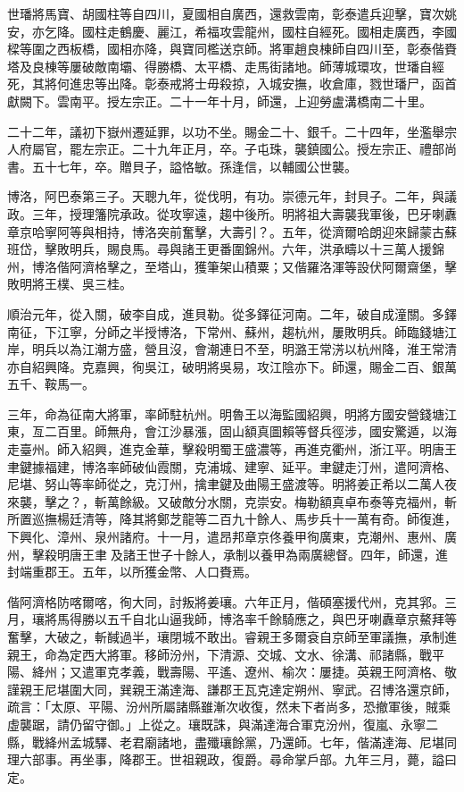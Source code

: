 \begin{pinyinscope}
世璠將馬寶、胡國柱等自四川，夏國相自廣西，還救雲南，彰泰遣兵迎擊，寶次姚安，亦乞降。國柱走鶴慶、麗江，希福攻雲龍州，國柱自經死。國相走廣西，李國樑等圍之西板橋，國相亦降，與寶同檻送京師。將軍趙良棟師自四川至，彰泰偕賚塔及良棟等屢破敵南壩、得勝橋、太平橋、走馬街諸地。師薄城環攻，世璠自經死，其將何進忠等出降。彰泰戒將士毋殺掠，入城安撫，收倉庫，戮世璠尸，函首獻闕下。雲南平。授左宗正。二十一年十月，師還，上迎勞盧溝橋南二十里。

二十二年，議初下嶽州遷延罪，以功不坐。賜金二十、銀千。二十四年，坐濫舉宗人府屬官，罷左宗正。二十九年正月，卒。子屯珠，襲鎮國公。授左宗正、禮部尚書。五十七年，卒。贈貝子，謚恪敏。孫逢信，以輔國公世襲。

博洛，阿巴泰第三子。天聰九年，從伐明，有功。崇德元年，封貝子。二年，與議政。三年，授理籓院承政。從攻寧遠，趨中後所。明將祖大壽襲我軍後，巴牙喇纛章京哈寧阿等與相持，博洛突前奮擊，大壽引？。五年，從濟爾哈朗迎來歸蒙古蘇班岱，擊敗明兵，賜良馬。尋與諸王更番圍錦州。六年，洪承疇以十三萬人援錦州，博洛偕阿濟格擊之，至塔山，獲筆架山積粟；又偕羅洛渾等設伏阿爾齋堡，擊敗明將王樸、吳三桂。

順治元年，從入關，破李自成，進貝勒。從多鐸征河南。二年，破自成潼關。多鐸南征，下江寧，分師之半授博洛，下常州、蘇州，趨杭州，屢敗明兵。師臨錢塘江岸，明兵以為江潮方盛，營且沒，會潮連日不至，明潞王常淓以杭州降，淮王常清亦自紹興降。克嘉興，徇吳江，破明將吳易，攻江陰亦下。師還，賜金二百、銀萬五千、鞍馬一。

三年，命為征南大將軍，率師駐杭州。明魯王以海監國紹興，明將方國安營錢塘江東，亙二百里。師無舟，會江沙暴漲，固山額真圖賴等督兵徑涉，國安驚遁，以海走臺州。師入紹興，進克金華，擊殺明蜀王盛濃等，再進克衢州，浙江平。明唐王聿鍵據福建，博洛率師破仙霞關，克浦城、建寧、延平。聿鍵走汀州，遣阿濟格、尼堪、努山等率師從之，克汀州，擒聿鍵及曲陽王盛渡等。明將姜正希以二萬人夜來襲，擊之？，斬萬餘級。又破敵分水關，克崇安。梅勒額真卓布泰等克福州，斬所置巡撫楊廷清等，降其將鄭芝龍等二百九十餘人、馬步兵十一萬有奇。師復進，下興化、漳州、泉州諸府。十一月，遣昂邦章京佟養甲徇廣東，克潮州、惠州、廣州，擊殺明唐王聿及諸王世子十餘人，承制以養甲為兩廣總督。四年，師還，進封端重郡王。五年，以所獲金幣、人口賚焉。

偕阿濟格防喀爾喀，徇大同，討叛將姜瓖。六年正月，偕碩塞援代州，克其郛。三月，瓖將馬得勝以五千自北山逼我師，博洛率千餘騎應之，與巴牙喇纛章京鰲拜等奮擊，大破之，斬馘過半，瓖閉城不敢出。睿親王多爾袞自京師至軍議撫，承制進親王，命為定西大將軍。移師汾州，下清源、交城、文水、徐溝、祁諸縣，戰平陽、絳州；又遣軍克孝義，戰壽陽、平遙、遼州、榆次：屢捷。英親王阿濟格、敬謹親王尼堪圍大同，巽親王滿達海、謙郡王瓦克達定朔州、寧武。召博洛還京師，疏言：「太原、平陽、汾州所屬諸縣雖漸次收復，然未下者尚多，恐撤軍後，賊乘虛襲踞，請仍留守御。」上從之。瓖既誅，與滿達海合軍克汾州，復嵐、永寧二縣，戰絳州孟城驛、老君廟諸地，盡殲瓖餘黨，乃還師。七年，偕滿達海、尼堪同理六部事。再坐事，降郡王。世祖親政，復爵。尋命掌戶部。九年三月，薨，謚曰定。


\end{pinyinscope}
